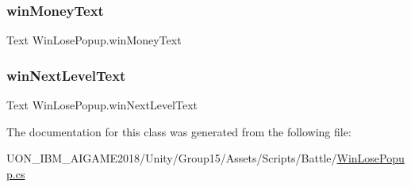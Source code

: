 \mbox{\label{class_win_lose_popup_a96b5a5d480b14cdae7e5a882bee30757}} 
\subsubsection{\texorpdfstring{winMoneyText}{winMoneyText}}
{\footnotesize\ttfamily Text Win\+Lose\+Popup.\+win\+Money\+Text}

\mbox{\label{class_win_lose_popup_ae36d60eb365ca9331d068e354a13eb00}} 
\subsubsection{\texorpdfstring{winNextLevelText}{winNextLevelText}}
{\footnotesize\ttfamily Text Win\+Lose\+Popup.\+win\+Next\+Level\+Text\hspace{0.3cm}{\ttfamily [private]}}



The documentation for this class was generated from the following file\+:\begin{DoxyCompactItemize}
\item 
U\+O\+N\+\_\+\+I\+B\+M\+\_\+\+A\+I\+G\+A\+M\+E2018/\+Unity/\+Group15/\+Assets/\+Scripts/\+Battle/\mbox{\hyperlink{_win_lose_popup_8cs}{Win\+Lose\+Popup.\+cs}}\end{DoxyCompactItemize}
